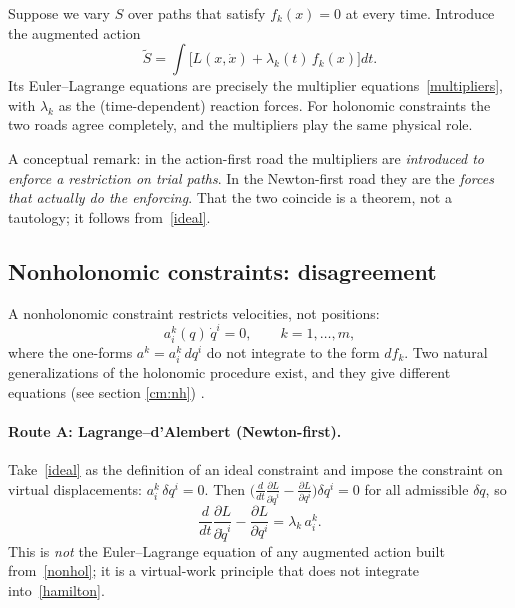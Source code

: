 Suppose we vary $S$ over paths that satisfy $f_k(x)=0$ at every time.
Introduce the augmented action
\begin{equation}
  \tilde S=\int\bigl[L(x,\dot x)+\lambda_k(t)\,f_k(x)\bigr]dt .
  \label{aug-holonomic}
\end{equation}
Its Euler--Lagrange equations are precisely the multiplier
equations~\eqref{multipliers}, with $\lambda_k$ as the (time-dependent)
reaction forces. For holonomic constraints the two roads agree completely, and
the multipliers play the same physical role.

A conceptual remark: in the action-first road the multipliers are
\emph{introduced to enforce a restriction on trial paths}. In the Newton-first
road they are the \emph{forces that actually do the enforcing}. That the two
coincide is a theorem, not a tautology; it follows from~\eqref{ideal}.

\subsection{Nonholonomic constraints: disagreement}
\label{nonholonomic}

A nonholonomic constraint restricts velocities, not positions:
\begin{equation}
  a^k_i(q)\,\dot q^i=0,\qquad k=1,\dots,m,
  \label{nonhol}
\end{equation}
where the one-forms $a^k=a^k_i\,dq^i$ do not integrate to the form $df_k$.
Two natural generalizations of the holonomic procedure exist, and they give
different equations (see section \ref{cm:nh}) .

\paragraph{Route A: Lagrange--d'Alembert (Newton-first).}
Take~\eqref{ideal} as the definition of an ideal constraint and impose the
constraint on virtual displacements:
$a^k_i\,\delta q^i=0$. Then
$\bigl(\frac{d}{dt}\frac{\partial L}{\partial\dot q^i}-\frac{\partial L}{\partial q^i}\bigr)\delta q^i=0$
for all admissible $\delta q$, so
\begin{equation}
  \frac{d}{dt}\frac{\partial L}{\partial\dot q^i}-\frac{\partial L}{\partial q^i}
  =\lambda_k\,a^k_i .
  \label{LdA}
\end{equation}
This is \emph{not} the Euler--Lagrange equation of any augmented action built
from~\eqref{nonhol}; it is a virtual-work principle that does not
integrate into~\eqref{hamilton}.


